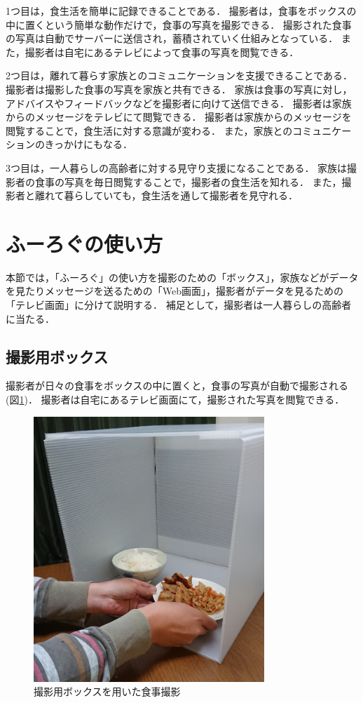 \documentclass[../report]{subfiles}
\begin{document}
1つ目は，食生活を簡単に記録できることである．
撮影者は，食事をボックスの中に置くという簡単な動作だけで，食事の写真を撮影できる．
撮影された食事の写真は自動でサーバーに送信され，蓄積されていく仕組みとなっている．
また，撮影者は自宅にあるテレビによって食事の写真を閲覧できる．

2つ目は，離れて暮らす家族とのコミュニケーションを支援できることである．
撮影者は撮影した食事の写真を家族と共有できる．
家族は食事の写真に対し，アドバイスやフィードバックなどを撮影者に向けて送信できる．
撮影者は家族からのメッセージをテレビにて閲覧できる．
撮影者は家族からのメッセージを閲覧することで，食生活に対する意識が変わる．
また，家族とのコミュニケーションのきっかけにもなる．

3つ目は，一人暮らしの高齢者に対する見守り支援になることである．
家族は撮影者の食事の写真を毎日閲覧することで，撮影者の食生活を知れる．
また，撮影者と離れて暮らしていても，食生活を通して撮影者を見守れる．


\section{ふーろぐの使い方}
本節では，「ふーろぐ」の使い方を撮影のための「ボックス」，家族などがデータを見たりメッセージを送るための「Web画面」，撮影者がデータを見るための「テレビ画面」に分けて説明する．
補足として，撮影者は一人暮らしの高齢者に当たる．

\subsection{撮影用ボックス}
撮影者が日々の食事をボックスの中に置くと，食事の写真が自動で撮影される(図\ref{fig:5_fl})．
撮影者は自宅にあるテレビ画面にて，撮影された写真を閲覧できる．

\begin{figure}[htbp]
    \begin{center}
        \includegraphics[height=10cm]{imgs/5_fl.png}
        \caption{撮影用ボックスを用いた食事撮影}
        \label{fig:5_fl}
    \end{center}
\end{figure}
\end{document}
